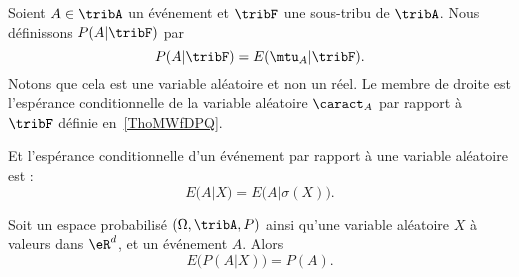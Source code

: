 \begin{definition}      \label{DEFooEYVCooCeyOXW}
	Soient \( A\in\tribA\) un événement et \( \tribF\) une sous-tribu de \( \tribA\). Nous définissons \( P(A|\tribF)\) par
	\begin{equation}
		P(A|\tribF)=E(\mtu_{A}|\tribF).
	\end{equation}
	Notons que cela est une variable aléatoire et non un réel. Le membre de droite est l'espérance conditionnelle de la variable aléatoire \( \caract_A\) par rapport à \( \tribF\) définie en~\ref{ThoMWfDPQ}.

	Et l'espérance conditionnelle d'un événement par rapport à une variable aléatoire est :
	\begin{equation}
		E(A|X)=E\big( A|\sigma(X) \big).
	\end{equation}
\end{definition}


\begin{proposition}
	Soit un espace probabilisé \( (\Omega,\tribA,P)\) ainsi qu'une variable aléatoire \( X\) à valeurs dans \( \eR^d\), et un événement \( A\). Alors
	\begin{equation}
		E\big( P(A|X) \big)=P(A).
	\end{equation}
\end{proposition}

